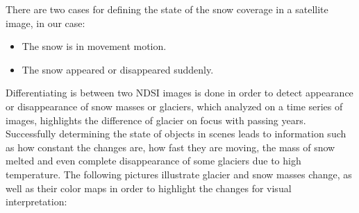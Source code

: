 \documentclass[12pt, a4paper]{report}
\begin{document}
  	There are two cases for defining the state of the snow coverage in a satellite image, in our case:
  	\begin{itemize}
  		\item The snow is in movement motion.
  		\item The snow appeared or disappeared suddenly.
  	\end{itemize}
  	Differentiating is between two NDSI images is done in order to detect appearance or disappearance of snow masses or glaciers, which analyzed on a time series of images, highlights the difference of glacier on focus with passing years. Successfully determining the state of objects in scenes leads to information such as how constant the changes are, how fast they are moving, the mass of snow melted and even complete disappearance of some glaciers due to high temperature. The following pictures illustrate glacier and snow masses change, as well as their color maps in order to highlight the changes for visual interpretation:
\end{document}
